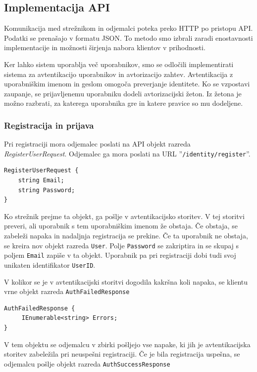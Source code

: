 \documentclass[a4paper, 12pt]{book}
\begin{document}
\subsection{Implementacija API}

Komunikacija med strežnikom in odjemalci poteka preko HTTP po pristopu API.
Podatki se prenašajo v formatu JSON.
To metodo smo izbrali zaradi enostavnosti implementacije in možnosti širjenja nabora klientov v prihodnosti.

Ker lahko sistem uporablja več uporabnikov, smo se odločili implementirati sistema za avtentikacijo uporabnikov in avtorizacijo zahtev.
Avtentikacija z uporabniškim imenom in geslom omogoča preverjanje identitete.
Ko se vzpostavi zaupanje, se prijavljenemu uporabniku dodeli avtorizacijski žeton.
Iz žetona je možno razbrati, za katerega uporabnika gre in katere pravice so mu dodeljene.

\subsubsection{Registracija in prijava}

Pri registraciji mora odjemalec poslati na API objekt razreda \textit{RegisterUserRequest}.
Odjemalec ga mora poslati na URL ''\texttt{/identity/register}''.

\begin{verbatim}
RegisterUserRequest {
    string Email; 
    string Password; 
} 
\end{verbatim}


Ko strežnik prejme ta objekt, ga pošlje v avtentikacijsko storitev.
V tej storitvi preveri, ali uporabnik s tem uporabniškim imenom že obstaja.
Če obstaja, se zabeleži napaka in nadaljnja registracija se prekine.
Če ta uporabnik ne obstaja, se kreira nov objekt razreda \texttt{User}.
Polje \texttt{Password} se zakriptira in se skupaj s poljem \texttt{Email} zapiše v ta objekt.
Uporabnik pa pri registraciji dobi tudi svoj unikaten identifikator \texttt{UserID}.

V kolikor se je v avtentikacijski storitvi dogodila kakršna koli napaka, se klientu vrne objekt razreda \texttt{AuthFailedResponse}

\begin{verbatim}
AuthFailedResponse { 
     IEnumerable<string> Errors; 
}
\end{verbatim}

\noindent V tem objektu se odjemalcu v zbirki pošljejo vse napake, ki jih je avtentikacijska storitev zabeležila pri neuspešni registraciji. 
Če je bila registracija uspešna, se odjemalcu pošlje objekt razreda \texttt{AuthSuccessResponse}
\end{document}
